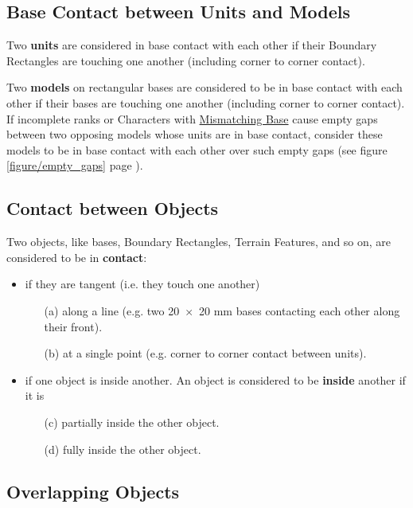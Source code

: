 \subsection{Base Contact between Units and Models}
\label{base_contact_between_units_and_models}

Two \textbf{units} are considered in base contact with each other if their Boundary Rectangles are touching one another (including corner to corner contact).

Two \textbf{models} on rectangular bases are considered to be in base contact with each other if their bases are touching one another (including corner to corner contact). If incomplete ranks or Characters with \hyperref[mismatching_bases]{Mismatching Base} cause empty gaps between two opposing models whose units are in base contact, consider these models to be in base contact with each other over such empty gaps (see figure \ref{figure/empty_gaps} page \pageref{figure/empty_gaps}).

\subsection{Contact between Objects}
\label{contact_between_objects}

Two objects, like bases, Boundary Rectangles, Terrain Features, and so on, are considered to be in \textbf{contact}:

\begin{itemize}[label={-}]
\item if they are tangent (i.e. they touch one another)
\begin{itemize}[label={}]
\item[(a)] along a line (e.g. two \num{20x20} \si{\milli\meter} bases contacting each other along their front).
\item[(b)]at a single point (e.g. corner to corner contact between units).
\end{itemize}
\item if one object is inside another. An object is considered to be \textbf{inside} another if it is
\begin{itemize}[label={}]
\item[(c)] partially inside the other object.
\item [(d)] fully inside the other object.
\end{itemize}
\end{itemize}

\subsection{Overlapping Objects}
\label{overlapping_of_objects}

